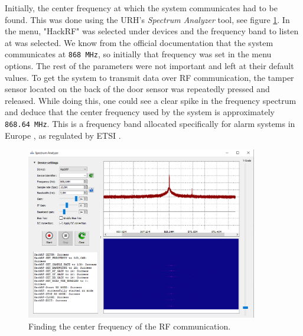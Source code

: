 Initially, the center frequency at which the system communicates had to be found. This was done using the URH's \textit{Spectrum Analyzer} tool, see figure \ref{fig:finding-center-freq}. In the menu, "HackRF" was selected under devices and the frequency band to listen at was selected. We know from the official documentation that the system communicates at \texttt{868 MHz}, so initially that frequency was set in the menu options. The rest of the parameters were not important and left at their default values. To get the system to transmit data over RF communication, the tamper sensor located on the back of the door sensor was repeatedly pressed and released. While doing this, one could see a clear spike in the frequency spectrum and deduce that the center frequency used by the system is approximately \texttt{868.64 MHz}. This is a frequency band allocated specifically for alarm systems in Europe , as regulated by ETSI .
\begin{figure}[!ht]
    \centering
    \includegraphics[width=0.9\textwidth]{images/6-pentesting/find-frequency.png}
    \caption{Finding the center frequency of the RF communication.}
    \label{fig:finding-center-freq}
\end{figure}

